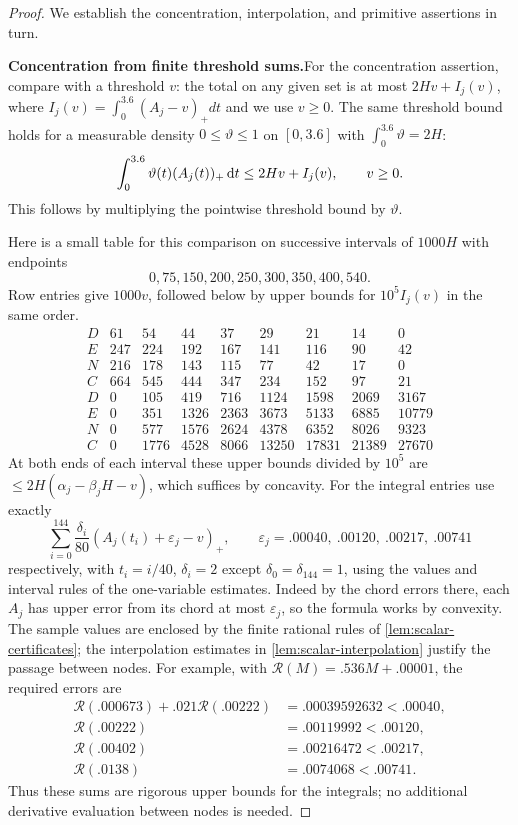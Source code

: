\begin{proof}
We establish the concentration, interpolation, and primitive assertions in turn.

\smallskip \noindent\textbf{Concentration from finite threshold sums.}\quad For the concentration assertion, compare with a threshold $v$: the total on any given set is at most $2Hv+I_j(v)$, where $I_j(v)=\int_0^{3.6}(A_j-v)_+ dt$ and we use $v\ge0$. The same threshold bound holds for a measurable density $0\le\vartheta\le1$ on $[0,3.6]$ with $\int_0^{3.6}\vartheta=2H$:
\[
 \int_0^{3.6}\vartheta(t)(A_j(t))_+\,\mathrm{d} t
 \le 2Hv+I_j(v),\qquad v\ge0.
\]
This follows by multiplying the pointwise threshold bound by $\vartheta$.

Here is a small table for this comparison on successive intervals of $1000H$ with endpoints
\[
 0,75,150,200,250,300,350,400,540.
\]
Row entries give $1000v$, followed below by upper bounds for $10^5 I_j(v)$ in the same order.
\[
\begin{array}{c|rrrrrrrr}
 D&61&54&44&37&29&21&14&0\\
 E&247&224&192&167&141&116&90&42\\
 N&216&178&143&115&77&42&17&0\\
 C&664&545&444&347&234&152&97&21\\\hline
 D&0&105&419&716&1124&1598&2069&3167\\
 E&0&351&1326&2363&3673&5133&6885&10779\\
 N&0&577&1576&2624&4378&6352&8026&9323\\
 C&0&1776&4528&8066&13250&17831&21389&27670
\end{array}
\]
At both ends of each interval these upper bounds divided by $10^5$ are $\le 2H(\alpha_j-\beta_j H-v)$, which suffices by concavity. For the integral entries use exactly
\[
 \sum_{i=0}^{144}\frac{\delta_i}{80}(A_j(t_i)+\varepsilon_j-v)_+,\qquad
 \varepsilon_j=.00040,\ .00120,\ .00217,\ .00741
\]
respectively, with $t_i=i/40$, $\delta_i=2$ except $\delta_0=\delta_{144}=1$, using the values and interval rules of the one-variable estimates. Indeed by the chord errors there, each $A_j$ has upper error from its chord at most $\varepsilon_j$, so the formula works by convexity. The sample values are enclosed by the finite rational rules of \cref{lem:scalar-certificates}; the interpolation estimates in \cref{lem:scalar-interpolation} justify the passage between nodes. For example, with $\mathcal{R}(M)=.536M+.00001$, the required errors are
\[
\begin{aligned}
 \mathcal{R}(.000673)+.021\mathcal{R}(.00222)&=.00039592632<.00040,\\
 \mathcal{R}(.00222)&=.00119992<.00120,\\
 \mathcal{R}(.00402)&=.00216472<.00217,\\
 \mathcal{R}(.0138)&=.0074068<.00741.
\end{aligned}
\]
Thus these sums are rigorous upper bounds for the integrals; no additional derivative evaluation between nodes is needed.


\end{proof}
